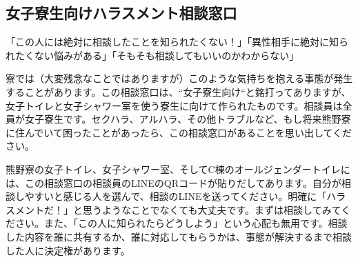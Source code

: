 \subsection{女子寮生向けハラスメント相談窓口}

「この人には絶対に相談したことを知られたくない！」「異性相手に絶対に知られたくない悩みがある」「そもそも相談してもいいのかわからない」

寮では（大変残念なことではありますが）このような気持ちを抱える事態が発生することがあります。この相談窓口は、“女子寮生向け“と銘打ってありますが、女子トイレと女子シャワー室を使う寮生に向けて作られたものです。相談員は全員が女子寮生です。セクハラ、アルハラ、その他トラブルなど、もし将来熊野寮に住んでいて困ったことがあったら、この相談窓口があることを思い出してください。


熊野寮の女子トイレ、女子シャワー室、そしてC棟のオールジェンダートイレには、この相談窓口の相談員のLINEのQRコードが貼りだしてあります。自分が相談しやすいと感じる人を選んで、相談のLINEを送ってください。明確に「ハラスメントだ！」と思うようなことでなくても大丈夫です。まずは相談してみてください。また、「この人に知られたらどうしよう」という心配も無用です。相談した内容を誰に共有するか、誰に対応してもらうかは、事態が解決するまで相談した人に決定権があります。
